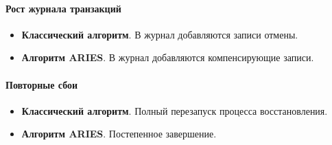 \paragraph{Рост журнала транзакций}

\begin{itemize}
	\item \textbf{Классический алгоритм}. В журнал добавляются записи отмены.
	\item \textbf{Алгоритм ARIES}. В журнал добавляются компенсирующие записи.
\end{itemize}

\paragraph{Повторные сбои}

\begin{itemize}
	\item \textbf{Классический алгоритм}. Полный перезапуск процесса восстановления.
	\item \textbf{Алгоритм ARIES}. Постепенное завершение.
\end{itemize}
